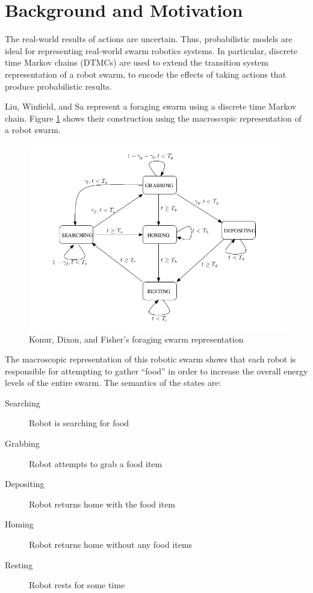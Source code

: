 \documentclass[11pt]{article}
\theoremstyle{definition}
\begin{document}
\section{Background and Motivation}
\label{sec:background-motivation}

The real-world results of actions are uncertain. Thus,
probabilistic models are ideal for representing
real-world swarm robotics systems.
In particular, discrete time Markov chains (DTMCs)
are used to extend the transition system representation
of a robot swarm, to encode the effects of taking actions
that produce probabilistic results.

Liu, Winfield, and Sa represent a foraging swarm
using a discrete time Markov chain. Figure \ref{fig:foraging}
shows their construction using the macroscopic
representation of a robot swarm.

\begin{figure}
    \caption{Konur, Dixon, and Fisher's foraging swarm representation}
    \label{fig:foraging}
    \includegraphics[width=\textwidth]{foraging.png}
\end{figure}

The macroscopic representation of this robotic swarm
shows that each robot is responsible for attempting
to gather ``food'' in order to increase the overall
energy levels of the entire swarm. The semantics
of the states are:

\begin{description}
    \item[Searching] Robot is searching for food
    \item[Grabbing] Robot attempts to grab a food item
    \item[Depositing] Robot returns home with the food item
    \item[Homing] Robot returns home without any food items
    \item[Resting] Robot rests for some time
\end{description}
\end{document}

